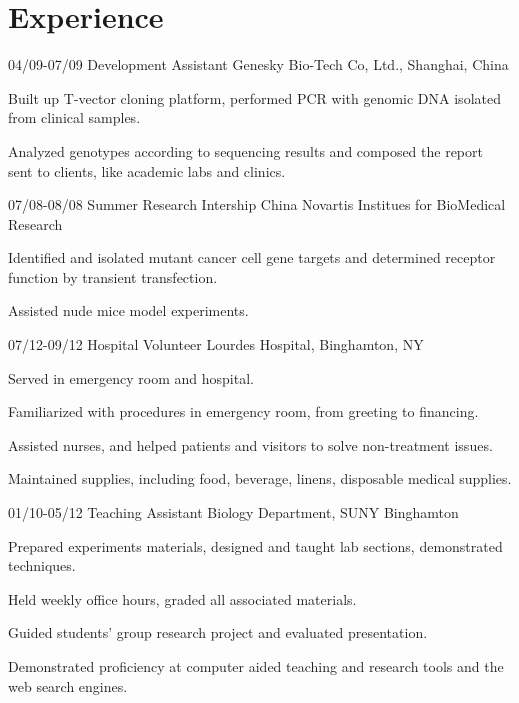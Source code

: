 \documentclass[]{friggeri-cv}
\begin{document}
\section{Experience}
\begin{entrylist}

  \entry
    {04/09-07/09}
    {Development Assistant}
		{Genesky Bio-Tech Co, Ltd., Shanghai, China}
		{
			\begin{tightemize}
				\item{Built up T-vector cloning platform, performed PCR with genomic DNA isolated
					from clinical samples.}
				\item{Analyzed genotypes according to sequencing results and composed the report
					sent to clients, like academic labs and clinics.}
			\end{tightemize}
		}

  \entry
    {07/08-08/08}
		{Summer Research Intership}
    {China Novartis Institues for BioMedical Research}
		{
			\begin{tightemize}
				\item{Identified and isolated mutant cancer cell gene targets and determined
					receptor function by transient transfection.}
				\item{Assisted nude mice model experiments.}
			\end{tightemize}
		}

    \entry
    {07/12-09/12}
		{Hospital Volunteer}
		{Lourdes Hospital, Binghamton, NY}
    {
			\begin{tightemize}
				\item{Served in emergency room and hospital.}
				\item{Familiarized with procedures in emergency room, from greeting
					to financing.}
				\item{Assisted nurses, and helped patients and visitors to solve non-treatment
					issues.}
				\item{Maintained supplies, including food, beverage, linens, disposable medical
					supplies.}
			\end{tightemize}
		}

    \entry
    {01/10-05/12}
		{Teaching Assistant}
		{Biology Department, SUNY Binghamton}
    {
			\begin{tightemize}
				\item{Prepared experiments materials, designed and taught lab sections,
					demonstrated techniques.}
				\item{Held weekly office hours, graded all associated materials.}
				\item{Guided students' group research project and evaluated
					presentation.}
				\item{Demonstrated proficiency at computer aided teaching and research tools and
					the web search engines.}
			\end{tightemize}
		}

\end{entrylist}
\end{document}
